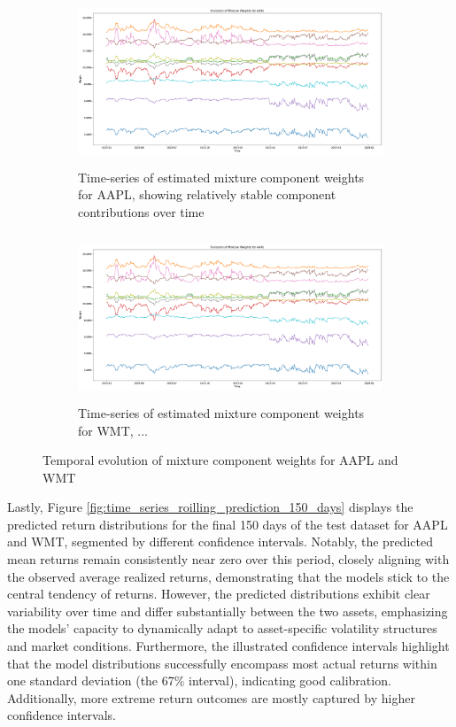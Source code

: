 \begin{figure}[H]
    \centering
    \begin{subfigure}[b]{0.49\textwidth}
        \centering
        \includegraphics[width=\linewidth, height=5cm]{Images/Results/APPL_weight_evolution_mixtures.png}
        \caption{Time-series of estimated mixture component weights for AAPL, showing relatively stable component contributions over time}
        \label{fig:APPL_weight_evolution_mixtures}
    \end{subfigure}
    \hfill
    \begin{subfigure}[b]{0.49\textwidth}
        \centering
        \includegraphics[width=\linewidth, height=5cm]{Images/Results/APPL_weight_evolution_mixtures.png}
        \caption{Time-series of estimated mixture component weights for WMT, ...}
        \label{fig:WMT_weight_evolution_mixtures}
    \end{subfigure}
    \caption{Temporal evolution of mixture component weights for AAPL and WMT}
    \label{fig:weight_evolution_mixtures}
\end{figure}

Lastly, Figure \ref{fig:time_series_roilling_prediction_150_days} displays the predicted return distributions for the final 150 days of the test dataset for AAPL and WMT, segmented by different confidence intervals. Notably, the predicted mean returns remain consistently near zero over this period, closely aligning with the observed average realized returns, demonstrating that the models stick to the central tendency of returns. However, the predicted distributions exhibit clear variability over time and differ substantially between the two assets, emphasizing the models' capacity to dynamically adapt to asset-specific volatility structures and market conditions. Furthermore, the illustrated confidence intervals highlight that the model distributions successfully encompass most actual returns within one standard deviation (the 67\% interval), indicating good calibration. Additionally, more extreme return outcomes are mostly captured by higher confidence intervals.

